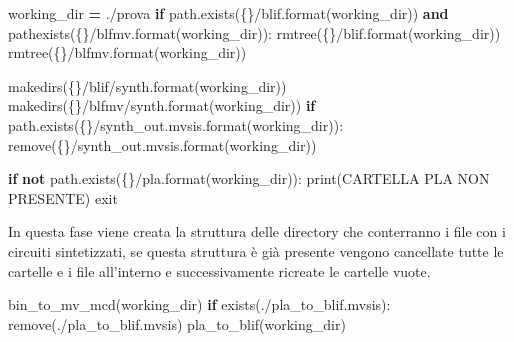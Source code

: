 \documentclass[
  italian,
]{book}
\newenvironment{Shaded}{\begin{snugshade}}{\end{snugshade}}
\newcommand{\BuiltInTok}[1]{#1}
\newcommand{\ControlFlowTok}[1]{\textcolor[rgb]{0.13,0.29,0.53}{\textbf{#1}}}
\newcommand{\KeywordTok}[1]{\textcolor[rgb]{0.13,0.29,0.53}{\textbf{#1}}}
\newcommand{\NormalTok}[1]{#1}
\newcommand{\OperatorTok}[1]{\textcolor[rgb]{0.81,0.36,0.00}{\textbf{#1}}}
\newcommand{\SpecialCharTok}[1]{\textcolor[rgb]{0.00,0.00,0.00}{#1}}
\newcommand{\StringTok}[1]{\textcolor[rgb]{0.31,0.60,0.02}{#1}}
\begin{document}
\begin{Shaded}
\begin{Highlighting}[]
\NormalTok{working\_dir }\OperatorTok{=} \StringTok{\textquotesingle{}./prova\textquotesingle{}}
\ControlFlowTok{if}\NormalTok{ path.exists(}\StringTok{\textquotesingle{}}\SpecialCharTok{\{\}}\StringTok{/blif\textquotesingle{}}\NormalTok{.}\BuiltInTok{format}\NormalTok{(working\_dir)) }\KeywordTok{and}\NormalTok{ pathexists(}\StringTok{\textquotesingle{}}\SpecialCharTok{\{\}}\StringTok{/blfmv\textquotesingle{}}\NormalTok{.}\BuiltInTok{format}\NormalTok{(working\_dir)):}
\NormalTok{    rmtree(}\StringTok{\textquotesingle{}}\SpecialCharTok{\{\}}\StringTok{/blif\textquotesingle{}}\NormalTok{.}\BuiltInTok{format}\NormalTok{(working\_dir))}
\NormalTok{    rmtree(}\StringTok{\textquotesingle{}}\SpecialCharTok{\{\}}\StringTok{/blfmv\textquotesingle{}}\NormalTok{.}\BuiltInTok{format}\NormalTok{(working\_dir))}
  
\NormalTok{makedirs(}\StringTok{\textquotesingle{}}\SpecialCharTok{\{\}}\StringTok{/blif/synth\textquotesingle{}}\NormalTok{.}\BuiltInTok{format}\NormalTok{(working\_dir))}
\NormalTok{makedirs(}\StringTok{\textquotesingle{}}\SpecialCharTok{\{\}}\StringTok{/blfmv/synth\textquotesingle{}}\NormalTok{.}\BuiltInTok{format}\NormalTok{(working\_dir))}
\ControlFlowTok{if}\NormalTok{ path.exists(}\StringTok{\textquotesingle{}}\SpecialCharTok{\{\}}\StringTok{/synth\_out.mvsis\textquotesingle{}}\NormalTok{.}\BuiltInTok{format}\NormalTok{(working\_dir)):}
\NormalTok{    remove(}\StringTok{\textquotesingle{}}\SpecialCharTok{\{\}}\StringTok{/synth\_out.mvsis\textquotesingle{}}\NormalTok{.}\BuiltInTok{format}\NormalTok{(working\_dir))}

\ControlFlowTok{if} \KeywordTok{not}\NormalTok{ path.exists(}\StringTok{\textquotesingle{}}\SpecialCharTok{\{\}}\StringTok{/pla\textquotesingle{}}\NormalTok{.}\BuiltInTok{format}\NormalTok{(working\_dir)):}
    \BuiltInTok{print}\NormalTok{(}\StringTok{\textquotesingle{}CARTELLA PLA NON PRESENTE\textquotesingle{}}\NormalTok{)}
\NormalTok{    exit}
\end{Highlighting}
\end{Shaded}

\newpage

In questa fase viene creata la struttura delle directory che conterranno i file con i circuiti sintetizzati, se questa struttura è già presente vengono cancellate tutte le cartelle e i file all'interno e successivamente ricreate le cartelle vuote.

\begin{Shaded}
\begin{Highlighting}[]
\NormalTok{bin\_to\_mv\_mcd(working\_dir)}
\ControlFlowTok{if}\NormalTok{ exists(}\StringTok{\textquotesingle{}./pla\_to\_blif.mvsis\textquotesingle{}}\NormalTok{):}
\NormalTok{    remove(}\StringTok{\textquotesingle{}./pla\_to\_blif.mvsis\textquotesingle{}}\NormalTok{)}
\NormalTok{pla\_to\_blif(working\_dir)}
\end{Highlighting}
\end{Shaded}
\end{document}
